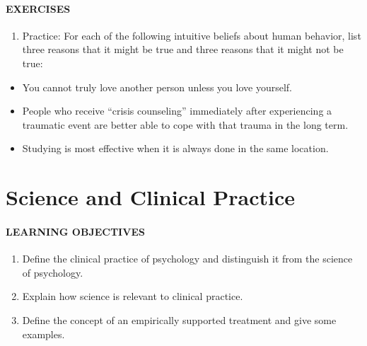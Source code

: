 \documentclass[
]{krantz}
\providecommand{\tightlist}{%
  \setlength{\itemsep}{0pt}\setlength{\parskip}{0pt}}
\begin{document}
\paragraph*{EXERCISES}\label{exercises-2}

\begin{enumerate}
\def\labelenumi{\arabic{enumi}.}
\tightlist
\item
  Practice: For each of the following intuitive beliefs about human behavior, list three reasons that it might be true and three reasons that it might not be true:
\end{enumerate}

\begin{itemize}
\tightlist
\item
  You cannot truly love another person unless you love yourself.
\item
  People who receive ``crisis counseling'' immediately after experiencing a traumatic event are better able to cope with that trauma in the long term.
\item
  Studying is most effective when it is always done in the same location.
\end{itemize}

\section{Science and Clinical Practice}\label{science-and-clinical-practice}

\paragraph*{LEARNING OBJECTIVES}\label{learning-objectives-3}

\begin{enumerate}
\def\labelenumi{\arabic{enumi}.}
\tightlist
\item
  Define the clinical practice of psychology and distinguish it from the science of psychology.
\item
  Explain how science is relevant to clinical practice.
\item
  Define the concept of an empirically supported treatment and give some examples.
\end{enumerate}
\end{document}

